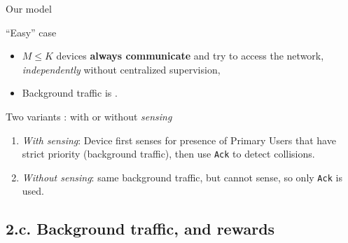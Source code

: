 \documentclass[12pt,english,ignorenonframetext,]{beamer}
\providecommand{\tightlist}{%
  \setlength{\itemsep}{0pt}\setlength{\parskip}{0pt}}
\begin{document}
\begin{frame}[fragile]{Our model}

\begin{block}{``Easy'' case}

\begin{itemize}\tightlist
\item
  \(M \leq K\) devices \textbf{always communicate} and try to access the
  network, \emph{independently} without centralized supervision,
\item
  Background traffic is \iid.
\end{itemize}

\end{block}

\pause

\begin{block}{Two variants : with or without \emph{sensing}}

\begin{enumerate}
\def\labelenumi{\arabic{enumi}.}
\tightlist
\item
  \emph{With sensing}: Device first senses for presence of Primary Users that have strict priority
  (background traffic), then use \texttt{Ack} to detect collisions.
\item
  \emph{Without sensing}: same background traffic, but cannot sense, so
  only \texttt{Ack} is used.
\end{enumerate}

\end{block}

\end{frame}



\subsection{\hfill{}2.c. Background traffic, and rewards\hfill{}}
\end{document}
